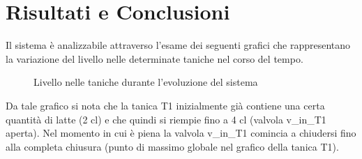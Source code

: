 \documentclass[12pt]{article}
\begin{document}
\section{Risultati e Conclusioni}
Il sistema è analizzabile attraverso l'esame dei seguenti grafici che rappresentano la variazione del livello nelle determinate taniche nel corso del tempo.
\begin{figure}[H]
\begin{center}
	
	
	\caption{Livello nelle taniche durante l'evoluzione del sistema}
\end{center}
\end{figure}
	Da tale grafico si nota che la tanica T1 inizialmente già contiene una certa quantità di latte (2 cl) e che quindi si riempie fino a 4 cl (valvola v\_in\_T1 aperta). Nel momento in cui è piena la valvola v\_in\_T1 comincia a chiudersi fino alla completa chiusura (punto di massimo globale nel grafico della tanica T1). \\
\end{document}
